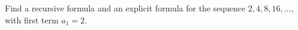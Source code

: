 Find a recursive formula and an explicit formula for the sequence $2,4,8,16,\dots$, with first term $a_1=2$.
